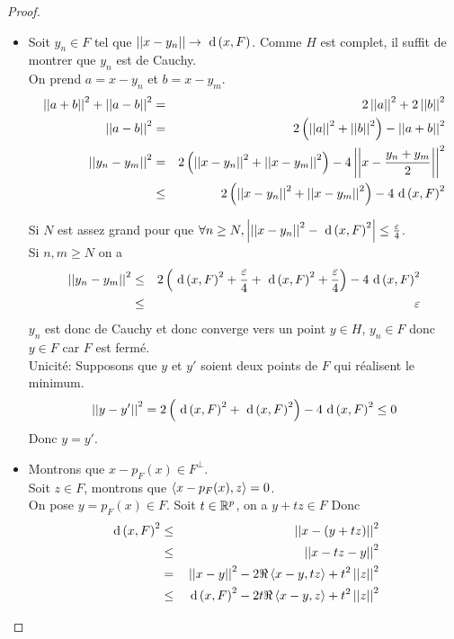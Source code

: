\begin{proof}

	\begin{itemize}
		\item Soit $y_n \in F$ tel que $\left|\left|x-y_n\right|\right| \to \text{ d}\left(x, F\right)$. Comme $H$ est complet, il suffit de montrer que $y_n$ est de Cauchy.\\
		      On prend $a = x - y_n$ et $b = x - y_m$.
		      \begin{eqnarray*}
			      \norm{a + b}^2  + \norm{a - b}^2 & = & 2 \norm{a}^2 + 2 \norm{b}^2\\
			      \norm {a-b}^2 & = & 2 \left( \norm{a}^2 +  \norm{b}^2 \right) -  \norm{a+b}^2\\
			      \norm {y_n - y_m}^2 & = & 2 \left( \norm{x-y_n}^2 +  \norm{x-y_m}^2 \right) - 4 \norm{x - \frac{y_n + y_m}{2}}^2 \\
			      & \leq & 2 \left( \norm{x-y_n}^2 +  \norm{x-y_m}^2 \right) - 4 {\dist x F}^2  %
		      \end{eqnarray*}

		      Si $N$ est assez grand pour que $\forall n \geq N, \left|\left|\left|x-y_n\right|\right|^2 - \text{ d}\left(x, F\right)^2\right| \leq\frac{\varepsilon}{4}$.\\
		      Si $n,m \geq N$ on a
		      \begin{eqnarray*}
			      \left|\left|y_n - y_m\right|\right|^2 & \leq & 2 \left( \text{ d}\left(x, F\right)^2 +   \frac \varepsilon 4 + \text{ d}\left(x, F\right)^2 +   \frac \varepsilon 4 \right) - 4 {\text{ d}\left(x, F\right)}^2 \\
			      &\leq & \varepsilon
		      \end{eqnarray*}
		      $y_n$ est donc de Cauchy et donc converge vers un point $y \in H$, $y_n \in F$ donc $y \in F$ car $F$ est fermé.\\

		      Unicité: Supposons que $y$ et $y'$ soient deux points de $F$ qui réalisent le minimum.\\
		      $$ \left|\left|y - y'\right|\right|^2 = 2 \left( {\text{ d}\left(x, F\right)}^2 + {\text{ d}\left(x, F\right)}^2 \right) - 4 {\text{ d}\left(x, F\right)}^2 \leq 0 $$
		      Donc $y = y'$.

		\item Montrons que $x - p_F(x) \in F^\perp$.\\
		      Soit $z \in F$, montrons que $\left\langle x - p_F(x), z \right\rangle = 0$.\\
		      On pose $y = p_F(x) \in F$. Soit $t\in \mathbb{R}^p$, on a $y + t z \in F$ Donc
		      \begin{eqnarray*}
			      {\text{ d}\left(x, F\right)}^2 & \leq & \left|\left|x - (y + t z)\right|\right|^2\\
			      & \leq & \left|\left|x - tz - y\right|\right|^2\\
			      & = & \left|\left|x - y\right|\right|^2 - 2\Re \left\langle x - y, tz \right\rangle + t^2 \left|\left|z\right|\right|^2\\
			      & \leq & {\text{ d}\left(x, F\right)}^2 - 2t \Re \left\langle x - y, z \right\rangle + t^2 \left|\left|z\right|\right|^2
		      \end{eqnarray*}


\end{itemize}
\end{proof}
